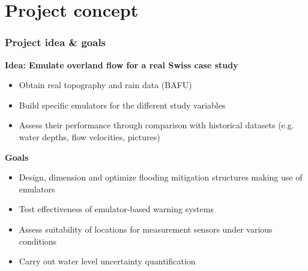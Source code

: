 \documentclass[xcolor=dvipsnames, USenglish]{beamer}  %
\begin{document}

\section{Project concept}
  \begin{frame}
    \frametitle{Project idea \& goals}
    \textbf{Idea: Emulate overland flow for a real Swiss case study}\\
    \begin{itemize}
      \item Obtain real topography and rain data (BAFU)
      \item Build specific emulators for the different study variables
      \item Assess their performance through comparison with historical datasets
        (e.g. water depths, flow velocities, pictures)
    \end{itemize}
    \textbf{Goals}
    \begin{itemize}
      \item Design, dimension and optimize flooding mitigation structures making use of emulators
      \item Test effectiveness of emulator-based warning systems
      \item Assess suitability of locations for measurement sensors under various conditions
      \item Carry out water level uncertainty quantification
    \end{itemize}
  \end{frame}

\end{document}
